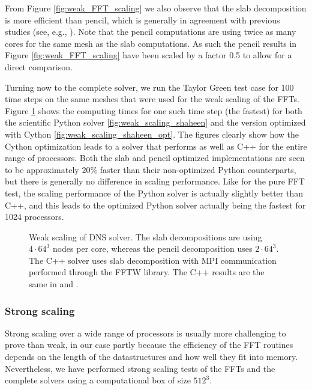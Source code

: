 \documentclass[final,3p,times,twocolumn]{elsarticle}
\begin{document}
From Figure \ref{fig:weak_FFT_scaling} we also observe that the slab 
decomposition is more efficient than pencil, which is generally in agreement 
with previous studies (see, e.g., \cite{pekurovsky2012}). Note that the pencil 
computations are using twice as many cores for the same mesh as the slab 
computations. As such the pencil results in Figure \ref{fig:weak_FFT_scaling} 
have been scaled by a factor 0.5 to allow for a direct comparison. 

Turning now to the complete solver, we run the Taylor Green test case for 100 
time steps on the same meshes that were used for the weak scaling of the FFTs. 
Figure \ref{fig:Weak_scaling} shows the computing times for one such time step 
(the fastest) for both the scientific Python solver 
\ref{fig:weak_scaling_shaheen} 
and the version optimized with Cython \ref{fig:weak_scaling_shaheen_opt}.
The figures clearly show how the Cython optimization leads to a solver that 
performs as well as C++ for the entire range of processors. Both the slab and 
pencil optimized implementations are seen to be approximately $20 \% $ faster 
than their non-optimized Python counterparts, but there is generally no 
difference in scaling performance. Like for the pure FFT test, the scaling 
performance of the Python solver is actually slightly better  than C++, and 
this leads to the optimized Python solver actually being the fastest for 1024 
processors.

\begin{figure}[ht!]
\caption{Weak scaling of DNS solver. The slab decompositions are using $4 \cdot 64^3$ nodes per core, whereas the pencil decomposition uses $2 \cdot 64^3 $. The C++ solver uses slab decomposition with MPI communication performed through the FFTW library. The C++ results are the same in  and .}
\label{fig:Weak_scaling}
\end{figure}

\subsubsection{Strong scaling}
\label{sec:strong_scaling}

Strong scaling over a wide range of processors is usually more challenging
to prove than weak, in our case partly because the efficiency of the FFT 
routines depends on the length of the datastructures and how well they fit into
memory. Nevertheless, we have performed strong scaling tests of the FFTs and the complete solvers using a computational box of size $512^3$. 
\end{document}
